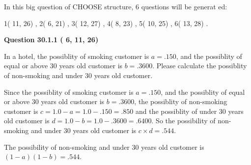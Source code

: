 \documentclass[12pt]{article}
\begin{document}
   
\vspace{0.2in}
   
 In this big question of CHOOSE structure,           6 questions will be generat
 ed: 
  
  
            1(         11,         26)
 ,
            2(          6,         21)
 ,
            3(         12,         27)
 ,
            4(          8,         23)
 ,
            5(         10,         25)
 ,
            6(         13,         28)
 .
  
\vspace{0.2in}
  
{\textbf{\Large{Question
30.1.1 
 (          6,         11,         26)
}}}
  
  
In a hotel, the possiblity of  %
smoking customer is
$a =  %
.150$, and the possiblity of  %
equal or above 30 years old customer is $ b =  %
.3600$.
Please calculate the possiblity of  %
 non-smoking and  %
under 30 years old customer.
 
 
 
\noindent{}
 
 

Since the possiblity of  %
smoking customer is $ a =  %
.150 $,
and the possiblity of  %
equal or above 30 years old customer is $ b =  %
.3600 $,
the possiblity of  %
non-smoking customer is $ c = 1.0 - a = 1.0 -
.150
=  %
.850 $ and the possiblity of  %
under 30 years old
customer is $ d = 1.0 - b = 1.0 -  %
.3600 =  %
.6400  $.
So the possibility of  %
 non-smoking and  %
under 30 years old
customer is $ c \times d =  %
.544 $.
 
 
 
\noindent{}
 
 

 
 
 
\noindent{}
 
 

The possibility of  %
 non-smoking and  %
under 30 years old
customer is $ (1-a)(1-b) =  %
.544 $.
 
 
\noindent{}
 
 

 
\vspace{0.3in}
   
\end{document}
